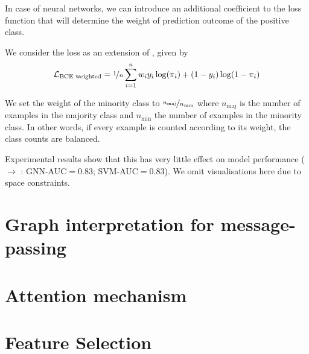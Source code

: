 \documentclass[
	fontsize=10pt, %
	twoside=false, %
	secnumdepth=1, %
]{kaobook}
\begin{document}
In case of neural networks, we can introduce an additional coefficient to the
loss function that will determine the weight of prediction outcome of the
positive class. 

We consider the  loss as
an extension of , given by
\begin{align}
  \label{eq:bce-loss-weighted}
  \mathcal{L}_{\text{BCE weighted}} = \nicefrac{1}{n} \sum_{i=1}^n w_i y_i \log(\pi_i) + (1-y_i) \log (1-\pi_i)
\end{align}


We set the weight of the minority class to
$\nicefrac{n_{\text{maj}}}{n_{\text{min}}}$ where $n_{\text{maj}}$ is the number
of examples in the majority
class and $n_{\text{min}}$ the number of examples in the minority class. In
other words, if every example is counted according to its weight, the class
counts are balanced.

Experimental results show that this has very little effect on model performance
(\ADLast $\rightarrow$ \PDMap: GNN-AUC$=0.83$; SVM-AUC$=0.83$). We omit
visualisations here due to space constraints.










\section{Graph interpretation for message-passing}

\section{Attention mechanism}


\section{Feature Selection}
\end{document}
